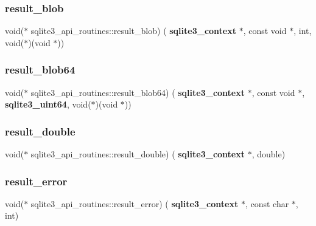 \mbox{\label{structsqlite3__api__routines_a7151cedc160519771de48f9dab665356}} 
\subsubsection{result\_blob}
{\footnotesize\ttfamily void($\ast$ sqlite3\+\_\+api\+\_\+routines\+::result\+\_\+blob) (\textbf{ sqlite3\+\_\+context} $\ast$, const void $\ast$, int, void($\ast$)(void $\ast$))}

\mbox{\label{structsqlite3__api__routines_a35e4c25461a807bfdebca7fbc1d0bc74}} 
\subsubsection{result\_blob64}
{\footnotesize\ttfamily void($\ast$ sqlite3\+\_\+api\+\_\+routines\+::result\+\_\+blob64) (\textbf{ sqlite3\+\_\+context} $\ast$, const void $\ast$, \textbf{ sqlite3\+\_\+uint64}, void($\ast$)(void $\ast$))}

\mbox{\label{structsqlite3__api__routines_ae5babdc991a56b484bc7a66a993435f3}} 
\subsubsection{result\_double}
{\footnotesize\ttfamily void($\ast$ sqlite3\+\_\+api\+\_\+routines\+::result\+\_\+double) (\textbf{ sqlite3\+\_\+context} $\ast$, double)}

\mbox{\label{structsqlite3__api__routines_ac80d799ae1e99289af007d9690ae3085}} 
\subsubsection{result\_error}
{\footnotesize\ttfamily void($\ast$ sqlite3\+\_\+api\+\_\+routines\+::result\+\_\+error) (\textbf{ sqlite3\+\_\+context} $\ast$, const char $\ast$, int)}

